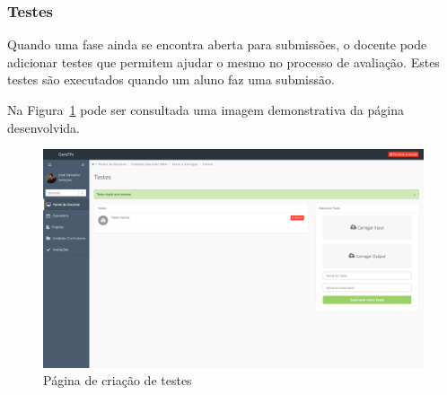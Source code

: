 \subsubsection{Testes} %
\label{ssub:testes}

Quando uma fase ainda se encontra aberta para submissões, o docente pode adicionar testes que permitem ajudar o mesmo no processo de avaliação. Estes testes são executados quando um aluno faz uma submissão.

Na Figura~\ref{fig:tests} pode ser consultada uma imagem demonstrativa da página desenvolvida.

\begin{figure}[H]
  \centering
  \includegraphics[width=.8\textwidth,center]{images/implementacao/docentes/testes}
  \caption{Página de criação de testes}
  \label{fig:tests}
\end{figure}

